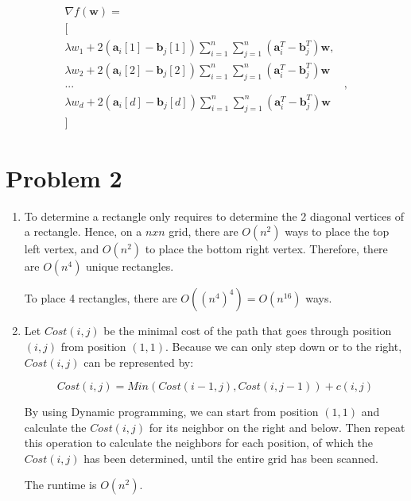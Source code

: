 \documentclass[12pt]{article}
\begin{document}
\begin{enumerate}[label=(\alph*)]
\begin{equation}
\begin{matrix}
    \nabla f(\boldsymbol{w}) = \\ [ & \\
        \lambda w_1 +
        2(\boldsymbol{a}_i[1] - \boldsymbol{b}_j[1])\sum_{i=1}^{n}\sum_{j=1}^{n}
        (\boldsymbol{a}_i^T - \boldsymbol{b}_j^T)\boldsymbol{w}, \\
        \lambda w_2 +
        2(\boldsymbol{a}_i[2] - \boldsymbol{b}_j[2])\sum_{i=1}^{n}\sum_{j=1}^{n}
        (\boldsymbol{a}_i^T - \boldsymbol{b}_j^T)\boldsymbol{w} \\
        ... &, \\
        \lambda w_d +
        2(\boldsymbol{a}_i[d] - \boldsymbol{b}_j[d])\sum_{i=1}^{n}\sum_{j=1}^{n}
        (\boldsymbol{a}_i^T - \boldsymbol{b}_j^T)\boldsymbol{w} & \\]

\end{matrix}
\end{equation}
\end{enumerate}

\section*{Problem 2}

\begin{enumerate}[label=(\alph*)]
\item
To determine a rectangle only requires to determine the 2 diagonal vertices of a rectangle. Hence, on a \(nxn\) grid, there are \(O(n^2)\) ways to place the top left vertex, and \(O(n^2)\) to place the bottom right vertex. Therefore, there are \(O(n^4)\) unique rectangles.

To place 4 rectangles, there are  \(O((n^4)^4) = O(n^16)\) ways.

\item
Let \(Cost(i,j)\) be the minimal cost of the path that goes through position \((i,j)\) from position \((1,1)\). Because we can only step down or to the right, \(Cost(i,j)\) can be represented by:

\begin{equation}
Cost(i,j) = Min(Cost(i-1, j),Cost(i, j-1)) + c(i,j)
\end{equation}

By using Dynamic programming, we can start from position \((1,1)\) and calculate the \(Cost(i,j)\) for its neighbor on the right and below. Then repeat this operation to calculate the neighbors for each position, of which the \(Cost(i,j)\) has been determined, until the entire grid has been scanned.

The runtime is \(O(n^2)\).
\end{enumerate}
\end{document}
